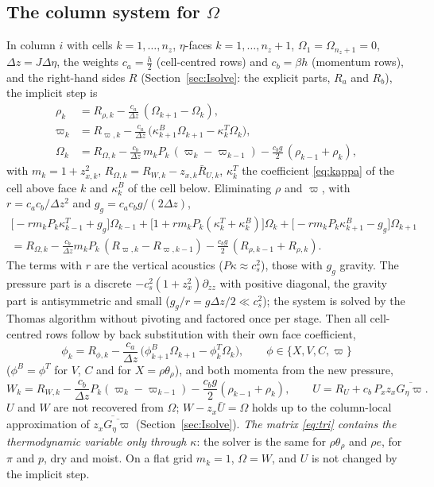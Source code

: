 \documentclass[11pt,a4paper]{article}
\newcommand{\pv}{\varpi}      %
\begin{document}
\subsection{The column system for $\Omega$}
In column $i$ with cells $k=1,\dots,n_z$, $\eta$-faces $k=1,\dots,n_z+1$, $\Omega_1=\Omega_{n_z+1}=0$, $\Delta z=J\Delta\eta$,
the weights $c_a=\tfrac h2$ (cell-centred rows) and $c_b=\beta h$ (momentum rows), and the right-hand sides $R$ (Section~\ref{sec:Isolve}: the explicit parts, $R_a$ and $R_b$), the implicit step is
\begin{align*}
\rho_k&=R_{\rho,k}-\frac{c_a}{\Delta z}\,(\Omega_{k+1}-\Omega_k),\\
\pv_k&=R_{\pv,k}-\frac{c_a}{\Delta z}\,\big(\kappa^B_{k+1}\Omega_{k+1}-\kappa^T_k\Omega_k\big),\\
\Omega_k&=R_{\Omega,k}-\frac{c_b}{\Delta z}\,m_kP_k\,(\pv_k-\pv_{k-1})-\frac{c_bg}2\,(\rho_{k-1}+\rho_k),
\end{align*}
with $m_k=1+z_{x,k}^2$, $R_{\Omega,k}=R_{W,k}-z_{x,k}\bar R_{U,k}$, $\kappa^T_k$ the coefficient \eqref{eq:kappa} of the cell
above face $k$ and $\kappa^B_k$ of the cell below. Eliminating $\rho$ and $\pv$, with $r=c_ac_b/\Delta z^2$ and
$g_g=c_ac_bg/(2\Delta z)$,
\begin{multline}
\big[-rm_kP_k\kappa^T_{k-1}+g_g\big]\Omega_{k-1}+\big[1+rm_kP_k(\kappa^T_k+\kappa^B_k)\big]\Omega_k+\big[-rm_kP_k\kappa^B_{k+1}-g_g\big]\Omega_{k+1}\\
=R_{\Omega,k}-\frac{c_b}{\Delta z}m_kP_k\,(R_{\pv,k}-R_{\pv,k-1})-\frac{c_bg}2\,(R_{\rho,k-1}+R_{\rho,k}).\label{eq:tri}
\end{multline}
The terms with $r$ are the vertical acoustics ($P\kappa\approx c_s^2$), those with $g_g$ gravity. The
pressure part is a discrete $-c_s^2(1+z_x^2)\partial_{zz}$ with positive diagonal, the gravity part is
antisymmetric and small ($g_g/r=g\Delta z/2\ll c_s^2$); the system is solved by the Thomas algorithm
without pivoting and factored once per stage. Then all cell-centred rows follow by back substitution
with their own face coefficient,
\[
\phi_k=R_{\phi,k}-\frac{c_a}{\Delta z}\,\big(\phi^B_{k+1}\Omega_{k+1}-\phi^T_k\Omega_k\big),\qquad\phi\in\{X,V,C,\pv\}
\]
($\phi^B=\phi^T$ for $V$, $C$ and for $X=\rho\theta_\rho$), and both momenta from the new pressure,
\[
W_k=R_{W,k}-\frac{c_b}{\Delta z}P_k(\pv_k-\pv_{k-1})-\frac{c_bg}2(\rho_{k-1}+\rho_k),\qquad
U=R_U+c_b\,P_xz_x\overline{G_\eta\pv} .
\]
$U$ and $W$ are not recovered from $\Omega$; $W-z_x\bar U=\Omega$ holds up to the column-local
approximation of $\overline{z_x\overline{G_\eta\pv}}$ (Section~\ref{sec:Isolve}). \emph{The matrix \eqref{eq:tri} contains
the thermodynamic variable only through $\kappa$}: the solver is the same for $\rho\theta_\rho$ and $\rho e$, for
$\pi$ and $p$, dry and moist. On a flat grid $m_k=1$, $\Omega=W$, and $U$ is not changed by the implicit step.
\end{document}

